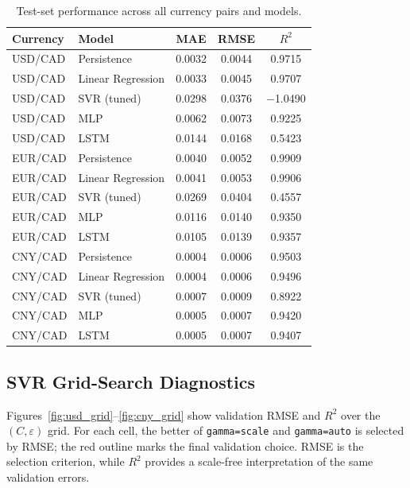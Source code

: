 \documentclass{article}
\begin{document}
\begin{table}[!t]
  \caption{Test-set performance across all currency pairs and models.}
  \label{tab:results}
  \centering
  \begin{tabular}{llccc}
    \toprule
    Currency & Model & MAE & RMSE & $R^2$ \\
    \midrule
    USD/CAD & Persistence       & 0.0032 & 0.0044 & 0.9715 \\
    USD/CAD & Linear Regression & 0.0033 & 0.0045 & 0.9707 \\
    USD/CAD & SVR (tuned)       & 0.0298 & 0.0376 & $-$1.0490 \\
    USD/CAD & MLP               & 0.0062 & 0.0073 & 0.9225 \\
    USD/CAD & LSTM              & 0.0144 & 0.0168 & 0.5423 \\
    \midrule
    EUR/CAD & Persistence       & 0.0040 & 0.0052 & 0.9909 \\
    EUR/CAD & Linear Regression & 0.0041 & 0.0053 & 0.9906 \\
    EUR/CAD & SVR (tuned)       & 0.0269 & 0.0404 & 0.4557 \\
    EUR/CAD & MLP               & 0.0116 & 0.0140 & 0.9350 \\
    EUR/CAD & LSTM              & 0.0105 & 0.0139 & 0.9357 \\
    \midrule
    CNY/CAD & Persistence       & 0.0004 & 0.0006 & 0.9503 \\
    CNY/CAD & Linear Regression & 0.0004 & 0.0006 & 0.9496 \\
    CNY/CAD & SVR (tuned)       & 0.0007 & 0.0009 & 0.8922 \\
    CNY/CAD & MLP               & 0.0005 & 0.0007 & 0.9420 \\
    CNY/CAD & LSTM              & 0.0005 & 0.0007 & 0.9407 \\
    \bottomrule
  \end{tabular}
\end{table}

\subsection{SVR Grid-Search Diagnostics}

Figures~\ref{fig:usd_grid}--\ref{fig:cny_grid} show validation RMSE and $R^2$ over the $(C,\varepsilon)$ grid. For each cell, the better of \texttt{gamma=scale} and \texttt{gamma=auto} is selected by RMSE; the red outline marks the final validation choice. RMSE is the selection criterion, while $R^2$ provides a scale-free interpretation of the same validation errors.
\end{document}
